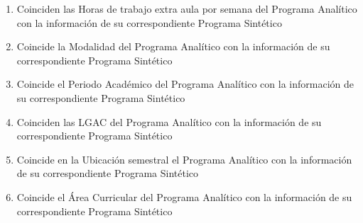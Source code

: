 \documentclass{article}
\begin{document}
\begin{Form}
\begin{enumerate}[leftmargin=*,nolistsep]
\item{Coinciden las Horas de trabajo extra aula por semana del
  Programa Anal\'{i}tico con la informaci\'{o}n de su correspondiente
  Programa Sint\'{e}tico   \hfill {}
  \quad
  }

\item{Coincide la Modalidad del Programa Anal\'{i}tico con la
  informaci\'{o}n de su correspondiente Programa Sint\'{e}tico
  \begin{flushright}
    \quad {}\end{flushright}}

\item{Coincide el Periodo Acad\'{e}mico del Programa Anal\'{i}tico con
  la informaci\'{o}n de su correspondiente Programa Sint\'{e}tico
  \begin{flushright}
  \quad
\end{flushright}
}

\item{Coinciden las LGAC del Programa Anal\'{i}tico con la
  informaci\'{o}n de su correspondiente Programa Sint\'{e}tico
  \begin{flushright}
  \quad%
  \end{flushright}}

\item{Coincide en la Ubicaci\'{o}n semestral el Programa Anal\'{i}tico
  con la informaci\'{o}n de su correspondiente Programa Sint\'{e}tico
  \begin{flushright}
  \quad
\end{flushright}
}

\item{Coincide el \'{A}rea Curricular del Programa Anal\'{i}tico con
  la informaci\'{o}n de su correspondiente Programa Sint\'{e}tico
  \begin{flushright}
  \quad
\end{flushright}
}


\end{enumerate}
\end{Form}
\end{document}
